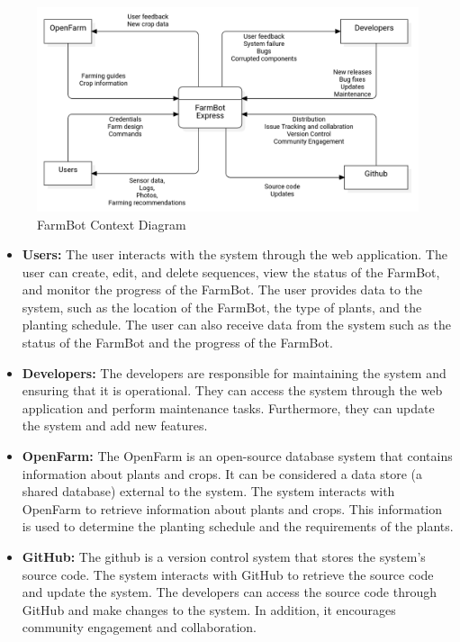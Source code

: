 \begin{figure}[H]
    \centering
    \includegraphics[width=1\textwidth]{Figures/ContextDiagram.png}
    \caption{FarmBot Context Diagram}\label{fig:ContextDiagram}
\end{figure}

\begin{itemize}
    \item \textbf{Users:} The user interacts with the system through the web application. The user can create, edit, and delete sequences, view the status of the FarmBot, and monitor the progress of the FarmBot. The user provides data to the system, such as the location of the FarmBot, the type of plants, and the planting schedule. The user can also receive data from the system such as the status of the FarmBot and the progress of the FarmBot.
    \item \textbf{Developers:} The developers are responsible for maintaining the system and ensuring that it is operational. They can access the system through the web application and perform maintenance tasks. Furthermore, they can update the system and add new features.
    \item \textbf{OpenFarm:} The OpenFarm is an open-source database system that contains information about plants and crops. It can be considered a data store (a shared database) external to the system. The system interacts with OpenFarm to retrieve information about plants and crops. This information is used to determine the planting schedule and the requirements of the plants.
    \item \textbf{GitHub:} The \gls{github} is a version control system that stores the system's source code. The system interacts with GitHub to retrieve the source code and update the system. The developers can access the source code through GitHub and make changes to the system. In addition, it encourages community engagement and collaboration.
\end{itemize}

